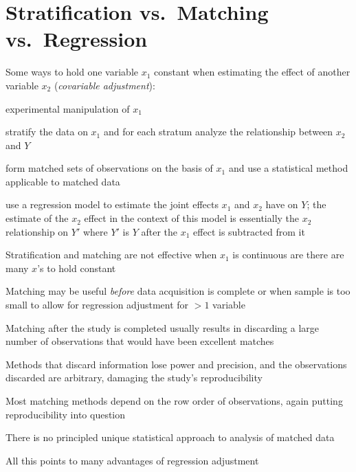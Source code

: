 \section{Stratification vs.\ Matching vs.\ Regression}%
\bi
\item Some ways to hold one variable $x_1$ constant when estimating the
  effect of another variable $x_2$ (\emph{covariable adjustment}):
  \bi
  \item experimental manipulation of $x_1$
  \item stratify the data on $x_1$ and for each stratum analyze the
    relationship between $x_2$ and $Y$
  \item form matched sets of observations on the basis of $x_1$ and
    use a statistical method applicable to matched data
  \item use a regression model to estimate the joint effects $x_1$ and
    $x_2$ have on $Y$; the estimate of the $x_2$ effect in the context
    of this model is essentially the $x_2$ relationship on $Y'$ where
    $Y'$ is $Y$ after the $x_1$ effect is subtracted from it
  \ei
\item Stratification and matching are not effective when $x_1$ is
  continuous are there are many $x$'s to hold constant
\item Matching may be useful \emph{before} data acquisition is
  complete or when sample is too small to allow for regression
  adjustment for $>1$ variable
\item Matching after the study is completed usually results in
  discarding a large number of observations that would have been
  excellent matches
\item Methods that discard information lose power and precision, and
  the observations discarded are arbitrary, damaging the study's
  reproducibility
\item Most matching methods depend on the row order of observations,
  again putting reproducibility into question
\item There is no principled unique statistical approach to analysis
  of matched data
\item All this points to many advantages of regression adjustment
\ei


